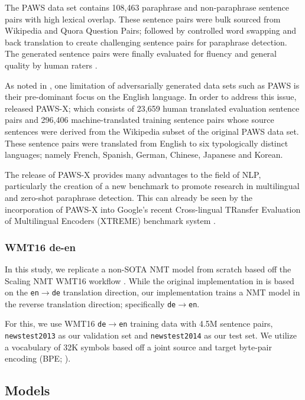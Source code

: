 \documentclass[11pt,a4paper]{article}
\begin{document}
The PAWS data set contains 108,463 paraphrase and non-paraphrase sentence pairs with high lexical overlap. These sentence pairs were bulk sourced from Wikipedia and Quora Question Pairs; followed by controlled word swapping and back translation to create challenging sentence pairs for paraphrase detection. The generated sentence pairs were finally evaluated for fluency and general quality by human raters \cite{zhang2019paws}.

As noted in \citet{pawsx2019emnlp}, one limitation of adversarially generated data sets such as PAWS is their pre-dominant focus on the English language. In order to address this issue, \citet{pawsx2019emnlp} released PAWS-X; which consists of 23,659 human translated evaluation sentence pairs and 296,406 machine-translated training sentence pairs whose source sentences were derived from the Wikipedia subset of the original PAWS data set. These sentence pairs were translated from English to six typologically distinct languages; namely French, Spanish, German, Chinese, Japanese and Korean.

The release of PAWS-X provides many advantages to the field of NLP, particularly the creation of a new benchmark to promote research in multilingual and zero-shot paraphrase detection. This can already be seen by the incorporation of PAWS-X into Google's recent Cross-lingual TRansfer Evaluation of Multilingual Encoders (XTREME) benchmark system \cite{hu2020xtreme}.

\subsubsection{WMT16 de-en}

In this study, we replicate a non-SOTA NMT model from scratch based off the Scaling NMT WMT16 workflow \cite{ott2018scaling}. While the original implementation in \citet{ott2018scaling} is based on the \texttt{en$\rightarrow$de} translation direction, our implementation trains a NMT model in the reverse translation direction; specifically \texttt{de$\rightarrow$en}.

For this, we use WMT16 \texttt{de$\rightarrow$en} training data with 4.5M sentence pairs, \texttt{newstest2013} as our validation set and \texttt{newstest2014} as our test set. We utilize a vocabulary of 32K symbols based off a joint source and target byte-pair encoding (BPE; \citealt{sennrich2015neural}).   

\subsection{Models}
\end{document}
